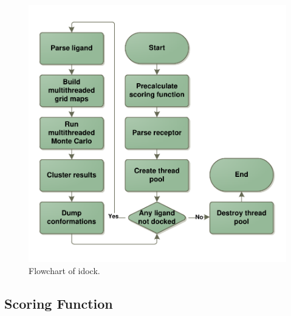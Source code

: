 \documentclass[10pt, conference, compsocconf]{IEEEtran}
\begin{document}
\begin{figure}
\centering
\includegraphics[width=\linewidth]{Figures/Flowchart.pdf}
\caption{Flowchart of idock.}
\label{fig:idockFlowchart}
\end{figure}

\subsection{Scoring Function}
\end{document}
